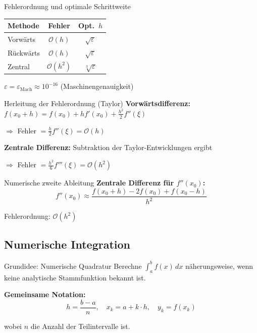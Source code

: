 \documentclass[a4paper,fontsize = 7pt]{scrartcl}
\renewcommand*{\arraystretch}{2}
\begin{document}
\begin{mainbox}{Fehlerordnung und optimale Schrittweite}
\renewcommand*{\arraystretch}{1.4}
\begin{center}
\begin{tabular}{l|c|c}
\textbf{Methode} & \textbf{Fehler} & \textbf{Opt.\ $h$} \\
\hline
Vorwärts & $\mathcal{O}(h)$ & $\sqrt{\varepsilon}$ \\
Rückwärts & $\mathcal{O}(h)$ & $\sqrt{\varepsilon}$ \\
Zentral & $\mathcal{O}(h^2)$ & $\sqrt[3]{\varepsilon}$ \\
\end{tabular}
\end{center}

$\varepsilon = \varepsilon_{\text{Mach}} \approx 10^{-16}$ (Maschinengenauigkeit)
\end{mainbox}

\begin{subbox}{Herleitung der Fehlerordnung (Taylor)}
\textbf{Vorwärtsdifferenz:}
$f(x_0 + h) = f(x_0) + hf'(x_0) + \frac{h^2}{2}f''(\xi)$

$\Rightarrow$ Fehler $= \frac{h}{2}f''(\xi) = \mathcal{O}(h)$

\textbf{Zentrale Differenz:} Subtraktion der Taylor-Entwicklungen ergibt

$\Rightarrow$ Fehler $= \frac{h^2}{6}f'''(\xi) = \mathcal{O}(h^2)$
\end{subbox}

\begin{subbox}{Numerische zweite Ableitung}
\textbf{Zentrale Differenz für $f''(x_0)$:}
$$f''(x_0) \approx \frac{f(x_0 + h) - 2f(x_0) + f(x_0 - h)}{h^2}$$

Fehlerordnung: $\mathcal{O}(h^2)$
\end{subbox}

\subsection{Numerische Integration}

\begin{mainbox}{Grundidee: Numerische Quadratur}
Berechne $\int_a^b f(x)\,dx$ näherungsweise, wenn keine analytische Stammfunktion bekannt ist.

\textbf{Gemeinsame Notation:}
$$h = \frac{b-a}{n}, \quad x_k = a + k \cdot h, \quad y_k = f(x_k)$$

wobei $n$ die Anzahl der Teilintervalle ist.
\end{mainbox}
\end{document}
